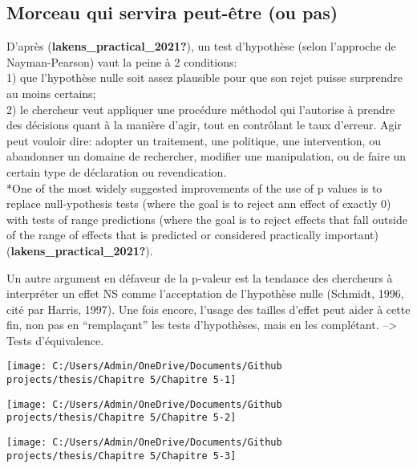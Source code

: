 \documentclass[
  english,
  man]{apa6}
\begin{document}
\hypertarget{morceau-qui-servira-peut-uxeatre-ou-pas}{%
\subsection{Morceau qui servira peut-être (ou pas)}\label{morceau-qui-servira-peut-uxeatre-ou-pas}}

D'après (\textbf{lakens\_practical\_2021?}), un test d'hypothèse (selon l'approche de Nayman-Pearson) vaut la peine à 2 conditions:\\
1) que l'hypothèse nulle soit assez plausible pour que son rejet puisse surprendre au moins certains;\\
2) le chercheur veut appliquer une procédure méthodol qui l'autorise à prendre des décisions quant à la manière d'agir, tout en contrôlant le taux d'erreur. Agir peut vouloir dire: adopter un traitement, une politique, une intervention, ou abandonner un domaine de rechercher, modifier une manipulation, ou de faire un certain type de déclaration ou revendication.\\
*One of the most widely suggested improvements of the use of p values is to replace null-ypothesis tests (where the goal is to reject ann effect of exactly 0) with tests of range predictions (where the goal is to reject effects that fall outside of the range of effects that is predicted or considered practically important) (\textbf{lakens\_practical\_2021?}).

Un autre argument en défaveur de la p-valeur est la tendance des chercheurs à interpréter un effet NS comme l'acceptation de l'hypothèse nulle (Schmidt, 1996, cité par Harris, 1997). Une fois encore, l'usage des tailles d'effet peut aider à cette fin, non pas en ``remplaçant'' les tests d'hypothèses, mais en les complétant. --\textgreater{} Tests d'équivalence.

\begin{center}\texttt{[image: C:/Users/Admin/OneDrive/Documents/Github projects/thesis/Chapitre 5/Chapitre 5-1]} \end{center}

\begin{center}\texttt{[image: C:/Users/Admin/OneDrive/Documents/Github projects/thesis/Chapitre 5/Chapitre 5-2]} \end{center}

\begin{center}\texttt{[image: C:/Users/Admin/OneDrive/Documents/Github projects/thesis/Chapitre 5/Chapitre 5-3]} \end{center}
\end{document}
